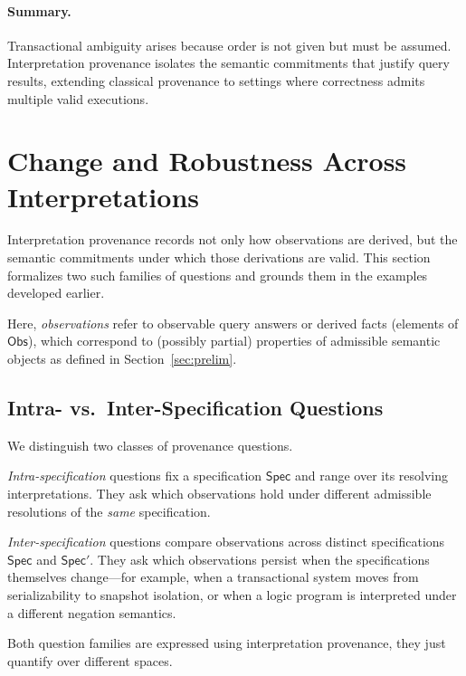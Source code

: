 \documentclass[acmsmall,nonacm]{acmart}
\theoremstyle{remark}
\numberwithin{definition}{section}
\numberwithin{theorem}{section}
\numberwithin{lemma}{section}
\numberwithin{corollary}{section}
\numberwithin{remark}{section}
\numberwithin{example}{section}
\numberwithin{observation}{section}
\numberwithin{assumption}{section}
\newcommand{\Obs}{\mathsf{Obs}}
\newcommand{\Spec}{\mathsf{Spec}}
\begin{document}
\paragraph{Summary.}
Transactional ambiguity arises because order is not given but must be assumed.
Interpretation provenance isolates the semantic commitments that justify query
results, extending classical provenance to settings where correctness admits
multiple valid executions.

\section{Change and Robustness Across Interpretations}
\label{sec:robustness}

Interpretation provenance records not only how observations are derived, but the
semantic commitments under which those derivations are valid.
This section formalizes two such families of questions and grounds them in the
examples developed earlier.

Here, \emph{observations} refer to observable query answers or derived facts (elements of $\Obs$), which correspond to (possibly partial) properties of admissible semantic objects as defined in Section~\ref{sec:prelim}.

\subsection{Intra- vs.\ Inter-Specification Questions}

We distinguish two classes of provenance questions.

\emph{Intra-specification} questions fix a specification $\Spec$ and range over its
resolving interpretations.
They ask which observations hold under different admissible resolutions
of the \emph{same} specification.

\emph{Inter-specification} questions compare observations across distinct
specifications $\Spec$ and $\Spec'$.
They ask which observations persist when the specifications themselves change---for
example, when a transactional system moves from serializability to snapshot
isolation, or when a logic program is interpreted under a different negation
semantics.

Both question families are expressed using interpretation provenance, they
just quantify over different spaces.
\end{document}
